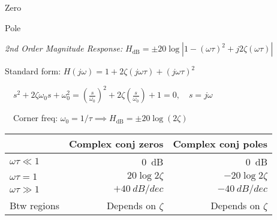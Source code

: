 \documentclass[twocolumn]{article}
\begin{document}
\begin{minipage}{0.49\columnwidth}
    \centering \hspace{1em} Zero \\[0.5em]
\end{minipage}
\hfill
\begin{minipage}{0.49\columnwidth}
    \centering \hspace{1em} Pole \\[0.5em]
\end{minipage}

\dotfill

\textit{2nd Order Magnitude Response:} $H_{\text{dB}} = \pm 20 \log| 1 - (\omega \tau)^2 + j 2 \zeta (\omega \tau) |$

Standard form: $H(j\omega) = 1 + 2\zeta (j\omega\tau) + (j\omega\tau)^2$

$\quad s^2 + 2 \zeta \omega_0 s + \omega_0^2 = \left( \frac{s}{\omega_0} \right)^2 + 2 \zeta \left(\frac{s}{\omega_0}\right) + 1 = 0, \quad s = j\omega$

$\quad$Corner freq: $\omega_0 = 1/\tau \implies H_{\text{dB}} = \pm 20 \log(2\zeta)$

\begin{table}[h!]
    \centering
    \begin{tabular}{lrr}
        \toprule
        & Complex conj zeros & Complex conj poles \\
        \midrule
        $\omega \tau \ll 1$ & \SI{0}{dB} & \SI{0}{dB} \\
        $\omega \tau = 1$ & $20 \log 2 \zeta$ & $-20 \log 2 \zeta$ \\
        $\omega \tau \gg 1$ & $+\SI{40}{dB/dec}$ & $-\SI{40}{dB/dec}$  \\
        Btw regions & Depends on $\zeta$ & Depends on $\zeta$ \\
        \bottomrule
    \end{tabular}
\end{table} \vspace{-.5em}
\end{document}

